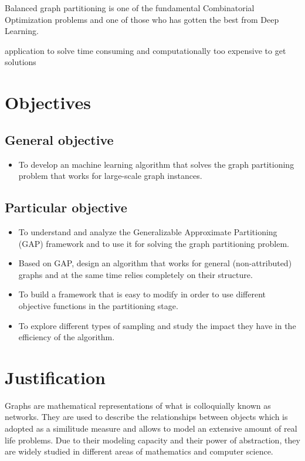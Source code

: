 Balanced graph partitioning is one of the fundamental Combinatorial Optimization problems and one of those who has gotten the best from Deep Learning.

application to solve 
time consuming and computationally too expensive to get solutions
 

\section{Objectives}

\subsection{General objective}
\begin{itemize}
    \item To develop an machine learning algorithm that solves the graph partitioning problem that works for large-scale graph instances.
\end{itemize}
\subsection{Particular objective}
\begin{itemize}
    \item To understand and analyze the Generalizable Approximate Partitioning (GAP) framework and to use it for solving the graph partitioning problem.
    \item Based on GAP, design an algorithm that works for general (non-attributed) graphs and at the same time relies completely on their structure.
    \item To build a framework that is easy to modify in order to use different objective functions in the partitioning stage.
    \item To explore different types of sampling and study the impact they have in the efficiency of the algorithm.
\end{itemize}
\section{Justification}

Graphs are mathematical representations of what is colloquially known as networks. They are used to describe the relationships between objects which is adopted as a similitude measure and allows to model an extensive amount of real life problems. Due to their modeling capacity and their power of abstraction, they are widely studied in different areas of mathematics and computer science. 

